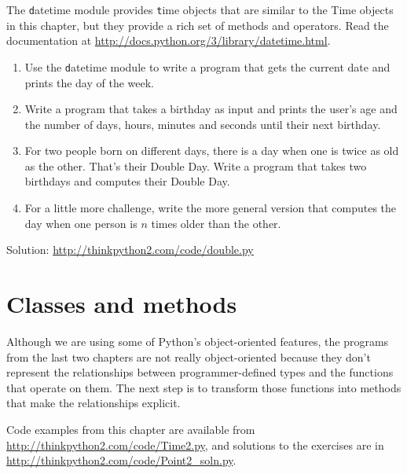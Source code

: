 \documentclass[
DIV=11,
fontsize=12,
twoside,
headinclude=false,
titlepage=firstiscover,
abstract=true,
headsepline=true,
footsepline=true,
chapterprefix=true, %
headings=big,
bibliography=totoc,%
captions=tableheading
]{scrbook}
\theoremstyle{definition}
\begin{document}
\begin{exercise}
\normalfont
{}

The {\texttt datetime} module provides {\texttt time} objects
that are similar to the Time objects in this chapter, but
they provide a rich set of methods and operators.  Read the
documentation at \url{http://docs.python.org/3/library/datetime.html}.

\begin{enumerate}

\item Use the {\texttt datetime} module to write a program that gets the
  current date and prints the day of the week.

\item Write a program that takes a birthday as input and prints the
  user's age and the number of days, hours, minutes and seconds until
  their next birthday.

\item For two people born on different days, there is a day when one
  is twice as old as the other.  That's their Double Day.  Write a
  program that takes two birthdays and computes their Double Day.

\item For a little more challenge, write the more general version that
  computes the day when one person is $n$ times older than the other.

\end{enumerate}

Solution: \url{http://thinkpython2.com/code/double.py}

\end{exercise}


\chapter{Classes and methods}

Although we are using some of Python's object-oriented features,
the programs from the last two chapters are not really
object-oriented because they don't represent the relationships
between programmer-defined types and the functions that operate
on them.  The next step is to transform those functions into
methods that make the relationships explicit.

Code examples from this chapter are available from
\url{http://thinkpython2.com/code/Time2.py}, and solutions
to the exercises are in \url{http://thinkpython2.com/code/Point2_soln.py}.
\end{document}
